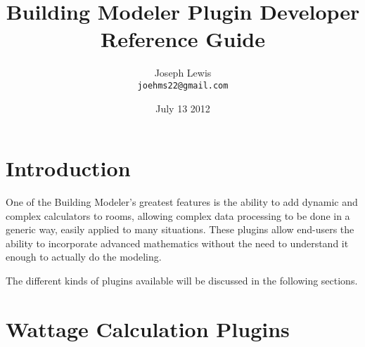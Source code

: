 \documentclass[12pt,a4paper]{article}
\begin{document}


\title{Building Modeler Plugin Developer Reference Guide}
\author{Joseph Lewis\\
	\texttt{joehms22@gmail.com}
	}
\date{July 13 2012}
\maketitle

\break


\tableofcontents
\break



\section{Introduction}

One of the Building Modeler's greatest features is the ability to add dynamic and
complex calculators to rooms, allowing complex data processing to be done in a
generic way, easily applied to many situations. These plugins allow end-users
the ability to incorporate advanced mathematics without the need to understand
it enough to actually do the modeling.

The different kinds of plugins available will be discussed in the following 
sections.


\section{Wattage Calculation Plugins}
\end{document}
